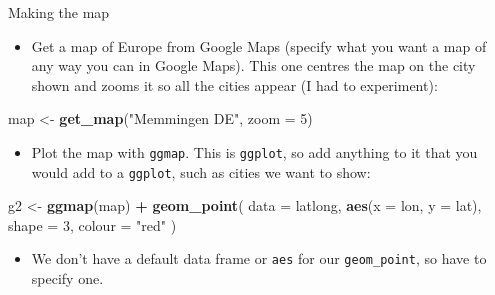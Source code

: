 \documentclass[ignorenonframetext,]{beamer}
\newenvironment{Shaded}{\begin{snugshade}}{\end{snugshade}}
\newcommand{\DataTypeTok}[1]{\textcolor[rgb]{0.13,0.29,0.53}{#1}}
\newcommand{\DecValTok}[1]{\textcolor[rgb]{0.00,0.00,0.81}{#1}}
\newcommand{\KeywordTok}[1]{\textcolor[rgb]{0.13,0.29,0.53}{\textbf{#1}}}
\newcommand{\NormalTok}[1]{#1}
\newcommand{\OperatorTok}[1]{\textcolor[rgb]{0.81,0.36,0.00}{\textbf{#1}}}
\newcommand{\StringTok}[1]{\textcolor[rgb]{0.31,0.60,0.02}{#1}}
\providecommand{\tightlist}{%
  \setlength{\itemsep}{0pt}\setlength{\parskip}{0pt}}
\begin{document}
\begin{frame}[fragile]{Making the map}
\protect\hypertarget{making-the-map}{}

\begin{itemize}
\tightlist
\item
  Get a map of Europe from Google Maps (specify what you want a map of
  any way you can in Google Maps). This one centres the map on the city
  shown and zooms it so all the cities appear (I had to experiment):
\end{itemize}

\begin{Shaded}
\begin{Highlighting}[]
\NormalTok{map <-}\StringTok{ }\KeywordTok{get_map}\NormalTok{(}\StringTok{"Memmingen DE"}\NormalTok{, }\DataTypeTok{zoom =} \DecValTok{5}\NormalTok{)}
\end{Highlighting}
\end{Shaded}

\begin{itemize}
\tightlist
\item
  Plot the map with \texttt{ggmap}. This is \texttt{ggplot}, so add
  anything to it that you would add to a \texttt{ggplot}, such as cities
  we want to show:
\end{itemize}

\begin{Shaded}
\begin{Highlighting}[]
\NormalTok{g2 <-}\StringTok{ }\KeywordTok{ggmap}\NormalTok{(map) }\OperatorTok{+}
\StringTok{  }\KeywordTok{geom_point}\NormalTok{(}
    \DataTypeTok{data =}\NormalTok{ latlong, }\KeywordTok{aes}\NormalTok{(}\DataTypeTok{x =}\NormalTok{ lon, }\DataTypeTok{y =}\NormalTok{ lat),}
    \DataTypeTok{shape =} \DecValTok{3}\NormalTok{, }\DataTypeTok{colour =} \StringTok{"red"}
\NormalTok{  )}
\end{Highlighting}
\end{Shaded}

\begin{itemize}
\tightlist
\item
  We don't have a default data frame or \texttt{aes} for our
  \texttt{geom\_point}, so have to specify one.
\end{itemize}

\end{frame}
\end{document}
